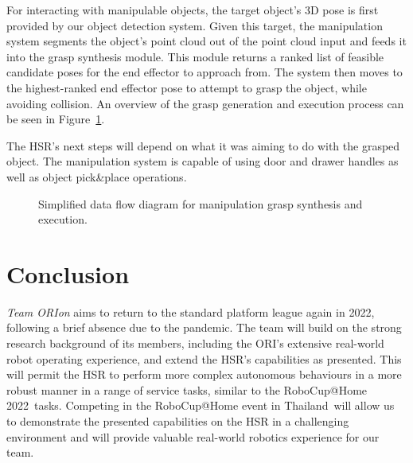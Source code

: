 \documentclass[runningheads,a4paper]{llncs}
\newcommand{\robospecs}{%
  \newpage%
  \pagenumbering{gobble}%
}
\newcommand{\teamori}{Team ORIon}
\newcommand{\competitionyear}{2022}
\newcommand{\competitioncountry}{Thailand}
\begin{document}
For interacting with manipulable objects, the target object's 3D pose is first provided by our object detection system. 
%
Given this target, the manipulation system segments the object's point cloud out of the point cloud input and feeds it into the grasp synthesis module.
%
This module returns a ranked list of feasible candidate poses for the end effector to approach from.
%
The system then moves to the highest-ranked end effector pose to attempt to grasp the object, while avoiding collision.
%
An overview of the grasp generation and execution process can be seen in Figure~\ref{fig:manipulation_data_flow}.

The HSR's next steps will depend on what it was aiming to do with the grasped object.
%
The manipulation system is capable of using door and drawer handles as well as object pick\&place operations.


\begin{figure}[!t]
	\centering
	\vspace{-10pt}%
	\caption{Simplified data flow diagram for manipulation grasp synthesis and execution.}
	\label{fig:manipulation_data_flow}
	\vspace{-3ex}
\end{figure}


\section{Conclusion}
\textit{\teamori{}} aims to return to the standard platform league again in \competitionyear, following a brief absence due to the pandemic. The team will build on the strong research background of its members, including the ORI's extensive real-world robot operating experience, and extend the HSR's capabilities as presented. This will permit the HSR to perform more complex autonomous behaviours in a more robust manner in a range of service tasks, similar to the RoboCup@Home \competitionyear\ tasks. 
Competing in the RoboCup@Home event in \competitioncountry\ will allow us to demonstrate the presented capabilities on the HSR in a challenging environment and will provide valuable real-world robotics experience for our team.





\robospecs

\end{document}
